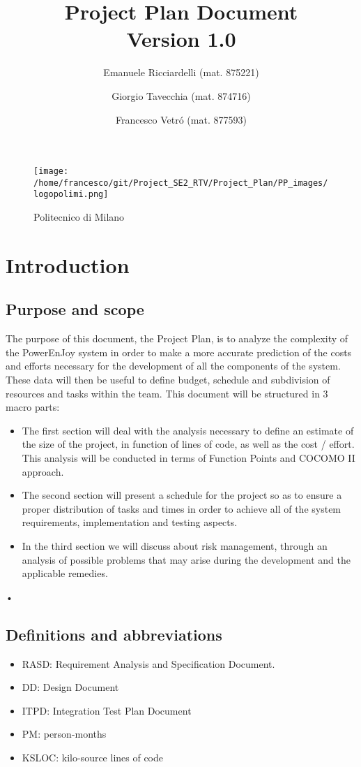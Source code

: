 \documentclass[10pt, a4paper,titlepage]{article}
\begin{document}
\begin{titlepage}
\title{Project Plan Document\\Version 1.0}
\author{Emanuele Ricciardelli (mat. 875221) \and Giorgio Tavecchia (mat. 874716) \and Francesco Vetr\'o (mat. 877593)}
\begin{figure}
\begin{center}
\texttt{[image: /home/francesco/git/Project\_SE2\_RTV/Project\_Plan/PP\_images/logopolimi.png]}
\caption{Politecnico di Milano}
\label{fig:logo}
\end{center}
\end{figure}
\maketitle
\end{titlepage}
\tableofcontents
\pagebreak
\section{Introduction}
\subsection{Purpose and scope}
The purpose of this document, the Project Plan, is to analyze the complexity of the PowerEnJoy system in order to make a more accurate prediction of the costs and efforts necessary for the development of all the components of the system.
These data will then be useful to define budget, schedule and subdivision of resources and tasks within the team.
This document will be structured in 3 macro parts:
\begin{itemize}
\item The first section will deal with the analysis necessary to define an estimate of the size of the project, in function of lines of code, as well as the cost / effort. This analysis will be conducted in terms of Function Points and COCOMO II approach.
\item The second section will present a schedule for the project so as to ensure a proper distribution of tasks and times in order to achieve all of the system requirements, implementation and testing aspects.
\item In the third section we will discuss about risk management, through an analysis of possible problems that may arise during the development and the applicable remedies.
\end{itemize}•
\subsection{Definitions and abbreviations}
\begin{itemize}
\item RASD: Requirement Analysis and Specification Document.
\item DD: Design Document
\item ITPD: Integration Test Plan Document
\item PM: person-months
\item KSLOC: kilo-source lines of code
\end{itemize}
\end{document}
